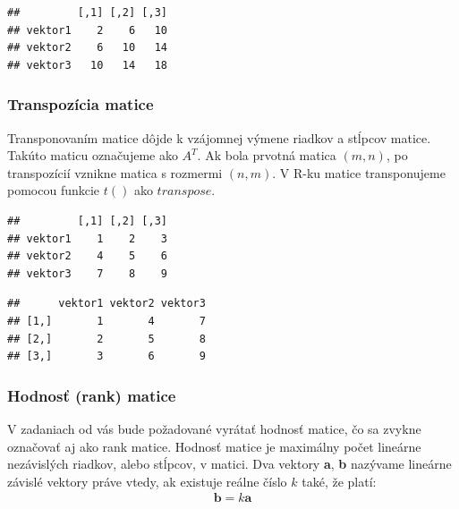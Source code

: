 \begin{verbatim}
##         [,1] [,2] [,3]
## vektor1    2    6   10
## vektor2    6   10   14
## vektor3   10   14   18
\end{verbatim}

\hypertarget{transpozuxedcia-matice}{%
\subsubsection{Transpozícia matice}\label{transpozuxedcia-matice}}

Transponovaním matice dôjde k vzájomnej výmene riadkov a stĺpcov matice.
Takúto maticu označujeme ako \(A^T\). Ak bola prvotná matica \((m, n)\),
po transpozícií vznikne matica s rozmermi \((n, m)\). V R-ku matice
transponujeme pomocou funkcie \(t()\) ako \(transpose\).

\begin{Shaded}
\begin{Highlighting}[]
\end{Highlighting}
\end{Shaded}

\begin{verbatim}
##         [,1] [,2] [,3]
## vektor1    1    2    3
## vektor2    4    5    6
## vektor3    7    8    9
\end{verbatim}

\begin{Shaded}
\begin{Highlighting}[]
\end{Highlighting}
\end{Shaded}

\begin{verbatim}
##      vektor1 vektor2 vektor3
## [1,]       1       4       7
## [2,]       2       5       8
## [3,]       3       6       9
\end{verbatim}

\hypertarget{hodnosux165-rank-matice}{%
\subsubsection{Hodnosť (rank) matice}\label{hodnosux165-rank-matice}}

V zadaniach od vás bude požadované vyrátať hodnosť matice, čo sa zvykne
označovať aj ako rank matice. Hodnosť matice je maximálny počet lineárne
nezávislých riadkov, alebo stĺpcov, v matici. Dva vektory \textbf{a}, \textbf{b} nazývame
lineárne závislé vektory práve vtedy, ak existuje reálne číslo \(k\)
také, že platí:
\begin{align*}
\textbf{b} = k  \textbf{a}
\end{align*}

